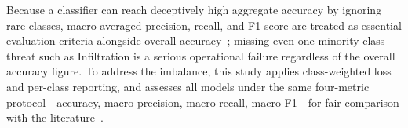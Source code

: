 \documentclass[5p,times]{elsarticle}
\begin{document}
	\begin{table}[!htbp]
		\centering
		\caption{Approximate class distribution in CIC-IDS2017. Minority
			classes ($<$0.1\%) represent the primary evaluation challenge.}
		\label{tab:class_dist}
		\renewcommand{\arraystretch}{0.88}
		\setlength{\tabcolsep}{5pt}
	\end{table}
	
	Because a classifier can reach deceptively high aggregate accuracy by
	ignoring rare classes, macro-averaged precision, recall, and F1-score
	are treated as essential evaluation criteria alongside overall
	accuracy~\cite{trbma2025}; missing even one minority-class threat such
	as Infiltration is a serious operational failure regardless of the
	overall accuracy figure. To address the imbalance, this study applies
	class-weighted loss and per-class reporting, and assesses all models
	under the same four-metric protocol---accuracy, macro-precision,
	macro-recall, macro-F1---for fair comparison with the
	literature~\cite{cnnbigru2022,rtids2022,trbma2025}.
	
\end{document}
